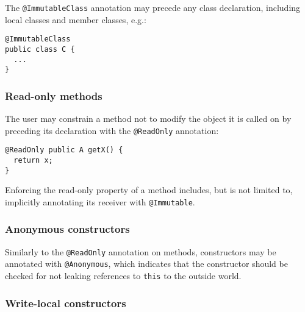 \documentclass{pracamgr}
\theoremstyle{break}
\theoremstyle{break}
\theoremstyle{break}
\begin{document}
The \texttt{@ImmutableClass} annotation may precede any class
declaration, including local classes and member classes, e.g.:

\begin{lstlisting}
@ImmutableClass
public class C {
  ...
}
\end{lstlisting}

\subsubsection{Read-only methods}

The user may constrain a method not to modify the object it is called
on by preceding its declaration with the \texttt{@ReadOnly} annotation:

\begin{lstlisting}
@ReadOnly public A getX() { 
  return x; 
}
\end{lstlisting}
Enforcing the read-only property of a method includes, but is not
limited to, implicitly annotating its receiver with
\texttt{@Immutable}.

\subsubsection{Anonymous constructors}

Similarly to the \texttt{@ReadOnly} annotation on methods,
constructors may be annotated with \texttt{@Anonymous}, which
indicates that the constructor should be checked for not leaking
references to \texttt{this} to the outside world.

\subsubsection{Write-local constructors}
\label{sub:mirroring-writelocal}
\end{document}
